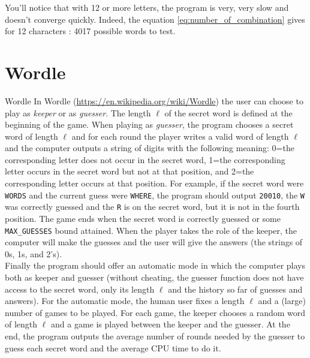 \documentclass[10pt,a4paper,hidelinks]{article}
\begin{document}
You'll notice that with 12 or more letters, the program is very, very slow and doesn't converge quickly. Indeed, the equation \ref{eq:number_of_combination} gives for 12 characters : 4017 possible words to test.

\section{Wordle}
\begin{exercise_description}{Wordle}
    In Wordle (\url{https://en.wikipedia.org/wiki/Wordle}) the user can choose to play as \textit{keeper} or as \textit{guesser}. The length $\ell$ of the secret word is defined at the beginning of the game. When playing as \textit{guesser}, the program chooses a secret word of length $\ell$ and for each round the player writes a valid word of length $\ell$ and the computer outputs a string of digits with the following meaning: 0=the corresponding letter does not occur in the secret word, 1=the corresponding letter occurs in the secret word but not at that position, and 2=the corresponding letter occurs at that position. For example, if the secret word were \verb|WORDS| and the current guess were \verb|WHERE|, the program should output \verb|20010|, the \verb|W| was correctly guessed and the \verb|R| is on the secret word, but it is not in the fourth position. The game ends when the secret word is correctly guessed or some \verb|MAX_GUESSES| bound attained. When the player takes the role of the keeper, the computer will make the guesses and the user will give the answers (the strings of 0s, 1s, and 2's).\\

    Finally the program should offer an automatic mode in which the computer plays both as keeper and guesser (without cheating, the guesser function does not have access to the secret word, only its length $\ell$ and the history so far of guesses and answers). For the automatic mode, the human user fixes a length $\ell$ and a (large) number of games to be played. For each game, the keeper chooses a random word of length $\ell$ and a game is played between the keeper and the guesser. At the end, the program outputs the average number of rounds needed by the guesser to guess each secret word and the average CPU time to do it.     
\end{exercise_description}
\end{document}

